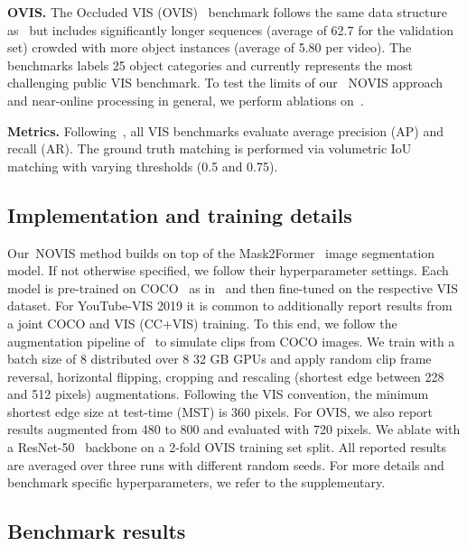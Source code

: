 \documentclass{article}
\newcommand{\method}{\mbox{NOVIS}}
\theoremstyle{plain}
\theoremstyle{definition}
\theoremstyle{remark}
\begin{document}
\noindent \textbf{OVIS.}
The Occluded VIS (OVIS)~\cite{ovis} benchmark follows the same data structure as~\cite{Yang2019vis} but includes significantly longer sequences (average of 62.7 for the validation set) crowded with more object instances (average of 5.80 per video).
The benchmarks labels 25 object categories and currently represents the most challenging public VIS benchmark.
To test the limits of our ~\method{} approach and near-online processing in general, we perform ablations on~\cite{ovis}.

\noindent \textbf{Metrics.}
Following~\cite{Yang2019vis}, all VIS benchmarks evaluate average precision (AP) and recall (AR).
The ground truth matching is performed via volumetric IoU matching with varying thresholds (0.5 and 0.75).




\subsection{Implementation and training details}
Our~\method{} method builds on top of the Mask2Former~\cite{cheng2021mask2former} image segmentation model.
If not otherwise specified, we follow their hyperparameter settings.
Each model is pre-trained on COCO~\cite{COCO} as in~\cite{cheng2021mask2former} and then fine-tuned on the respective VIS dataset.
For YouTube-VIS 2019 it is common to additionally report results from a joint COCO and VIS (CC+VIS) training.
To this end, we follow the augmentation pipeline of~\cite{heo2022vita} to simulate clips from COCO images.
We train with a batch size of 8 distributed over 8  32 GB GPUs and apply random clip frame reversal, horizontal flipping, cropping and rescaling (shortest edge between 228 and 512 pixels) augmentations.
Following the VIS convention, the minimum shortest edge size at test-time (MST) is 360 pixels.
For OVIS, we also report results augmented from 480 to 800 and evaluated with 720 pixels.
We ablate with a ResNet-50~\cite{resnet} backbone on a 2-fold OVIS training set split.
All reported results are averaged over three runs with different random seeds.
For more details and benchmark specific hyperparameters, we refer to the supplementary.

\subsection{Benchmark results}
\end{document}
